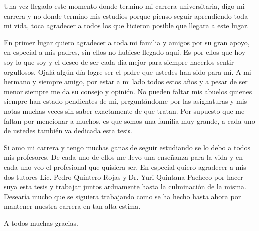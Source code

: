 \begin{acknowledgements}

Una vez llegado este momento donde termino mi carrera universitaria, digo mi carrera y no donde termino mis estudios porque pienso seguir aprendiendo toda mi vida, toca agradecer a todos los que hicieron posible que llegara a este lugar.

En primer lugar quiero agradecer a toda mi familia y amigos por su gran apoyo, en especial a mis padres, sin ellos no hubiese llegado aqu\'i. Es por ellos que hoy soy lo que soy y el deseo de ser cada d\'ia mejor para siempre hacerlos sentir orgullosos. Ojal\'a alg\'un d\'ia logre ser el padre que ustedes han sido para m\'i. A mi hermano y siempre amigo, por estar a mi lado todos estos a\~nos y a pesar de ser menor siempre me da su consejo y opini\'on. No pueden faltar mis abuelos quienes siempre han estado pendientes de mi, pregunt\'andome por las asignaturas y mis notas muchas veces sin saber exactamente de que tratan. Por supuesto que me faltan por mencionar a muchos, es que somos una familia muy grande, a cada uno de ustedes tambi\'en va dedicada esta tesis.

Si amo mi carrera y tengo muchas ganas de seguir estudiando se lo debo a todos mis profesores. De cada uno de ellos me llevo una ense\~nanza para la vida y en cada uno veo el profesional que quisiera ser. En especial quiero agradecer a mis dos tutores Lic. Pedro Quintero Rojas y Dr. Yuri Quintana Pacheco por hacer suya esta tesis y trabajar juntos arduamente hasta la culminaci\'on de la misma. Desear\'ia mucho que se siguiera trabajando como se ha hecho hasta ahora por mantener nuestra carrera en tan alta estima.

A todos muchas gracias.

\end{acknowledgements}